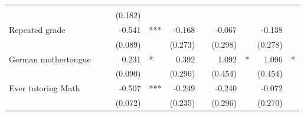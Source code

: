 \documentclass{article}
\begin{document}
\begin{table}[!h]
\begin{tabular}{lllllllllll}
  \multicolumn{1}{r}{} &
  \multicolumn{1}{l}{} &
  \multicolumn{1}{r}{} &
  \multicolumn{1}{l}{} &
  \multicolumn{1}{r}{} &
  \multicolumn{1}{l}{} \\
\multicolumn{1}{l}{} &
  \multicolumn{1}{r}{} &
  \multicolumn{1}{l}{} &
  \multicolumn{1}{r}{(0.182)} &
  \multicolumn{1}{l}{} &
  \multicolumn{1}{r}{} &
  \multicolumn{1}{l}{} &
  \multicolumn{1}{r}{} &
  \multicolumn{1}{l}{} &
  \multicolumn{1}{r}{} &
  \multicolumn{1}{l}{} \\
\multicolumn{1}{l}{Repeated grade} &
  \multicolumn{1}{r}{} &
  \multicolumn{1}{l}{} &
  \multicolumn{1}{r}{-0.541} &
  \multicolumn{1}{l}{***} &
  \multicolumn{1}{r}{-0.168} &
  \multicolumn{1}{l}{} &
  \multicolumn{1}{r}{-0.067} &
  \multicolumn{1}{l}{} &
  \multicolumn{1}{r}{-0.138} &
  \multicolumn{1}{l}{} \\
\multicolumn{1}{l}{} &
  \multicolumn{1}{r}{} &
  \multicolumn{1}{l}{} &
  \multicolumn{1}{r}{(0.089)} &
  \multicolumn{1}{l}{} &
  \multicolumn{1}{r}{(0.273)} &
  \multicolumn{1}{l}{} &
  \multicolumn{1}{r}{(0.298)} &
  \multicolumn{1}{l}{} &
  \multicolumn{1}{r}{(0.278)} &
  \multicolumn{1}{l}{} \\
\multicolumn{1}{l}{German mothertongue} &
  \multicolumn{1}{r}{} &
  \multicolumn{1}{l}{} &
  \multicolumn{1}{r}{0.231} &
  \multicolumn{1}{l}{*} &
  \multicolumn{1}{r}{0.392} &
  \multicolumn{1}{l}{} &
  \multicolumn{1}{r}{1.092} &
  \multicolumn{1}{l}{*} &
  \multicolumn{1}{r}{1.096} &
  \multicolumn{1}{l}{*} \\
\multicolumn{1}{l}{} &
  \multicolumn{1}{r}{} &
  \multicolumn{1}{l}{} &
  \multicolumn{1}{r}{(0.090)} &
  \multicolumn{1}{l}{} &
  \multicolumn{1}{r}{(0.296)} &
  \multicolumn{1}{l}{} &
  \multicolumn{1}{r}{(0.454)} &
  \multicolumn{1}{l}{} &
  \multicolumn{1}{r}{(0.454)} &
  \multicolumn{1}{l}{} \\
\multicolumn{1}{l}{Ever tutoring Math} &
  \multicolumn{1}{r}{} &
  \multicolumn{1}{l}{} &
  \multicolumn{1}{r}{-0.507} &
  \multicolumn{1}{l}{***} &
  \multicolumn{1}{r}{-0.249} &
  \multicolumn{1}{l}{} &
  \multicolumn{1}{r}{-0.240} &
  \multicolumn{1}{l}{} &
  \multicolumn{1}{r}{-0.072} &
  \multicolumn{1}{l}{} \\
\multicolumn{1}{l}{} &
  \multicolumn{1}{r}{} &
  \multicolumn{1}{l}{} &
  \multicolumn{1}{r}{(0.072)} &
  \multicolumn{1}{l}{} &
  \multicolumn{1}{r}{(0.235)} &
  \multicolumn{1}{l}{} &
  \multicolumn{1}{r}{(0.296)} &
  \multicolumn{1}{l}{} &
  \multicolumn{1}{r}{(0.270)} &
  \multicolumn{1}{l}{} \\

\end{tabular}
\end{table}
\end{document}

